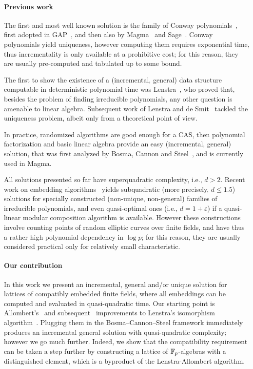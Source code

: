 \documentclass{sig-alternate}
\begin{document}
\paragraph{Previous work}
The first and most well known solution is the family of Conway
polynomials~\cite{Nickel1988,heath+loehr99}, first adopted in
GAP~\cite{GAP4}, and then also by Magma~\cite{MAGMA} and
Sage~\cite{Sage}. %
Conway polynomials yield uniqueness, however computing them requires
exponential time, thus incrementality is only available at a
prohibitive cost; for this reason, they are usually pre-computed and
tabulated up to some bound.

The first to show the existence of a (incremental, general) data
structure computable in deterministic polynomial time was
Lenstra~\cite{LenstraJr91}, who proved that, besides the problem of
finding irreducible polynomials, any other question is amenable to
linear algebra. %
Subsequent work of Lenstra and de
Smit~\cite{lenstra+desmit08-stdmodels} tackled the uniqueness problem,
albeit only from a theoretical point of view. %

In practice, randomized algorithms are good enough for a CAS, then
polynomial factorization and basic linear algebra provide an easy
(incremental, general) solution, that was first analyzed by Bosma,
Cannon and Steel~\cite{bosma+cannon+steel97}, and is currently used in
Magma. %

All solutions presented so far have superquadratic complexity, i.e.,
$d>2$. %
Recent work on embedding algorithms~\cite{DoSc12,DeDoSc13,DeDoSc2014}
yields subquadratic (more precisely, $d\le 1.5$) solutions for
specially constructed (non-unique, non-general) families of
irreducible polynomials, and even quasi-optimal ones (i.e.,
$d=1+\varepsilon$) if a quasi-linear modular composition algorithm is
available. %
However these constructions involve counting points of random elliptic
curves over finite fields, and have thus a rather high polynomial
dependency in $\log p$; for this reason, they are usually considered
practical only for relatively small characteristic.


\paragraph{Our contribution}
In this work we present an incremental, general and/or unique solution
for lattices of compatibly embedded finite fields, where all
embeddings can be computed and evaluated in quasi-quadratic time. %
Our starting point is Allombert's~\cite{Allombert02} and
subsequent~\cite{brieulle2018computing} improvements to Lenstra's
isomorphism algorithm~\cite{LenstraJr91}. %
Plugging them in the Bosma--Cannon--Steel framework immediately produces
an incremental general solution with quasi-quadratic complexity;
however we go much further. %
Indeed, we show that the compatibility requirement can be taken a step
further by constructing a lattice of $\mathbb{F}_{p}$-algebras with a
distinguished element, which is a byproduct of the Lenstra-Allombert
algorithm.
\end{document}
